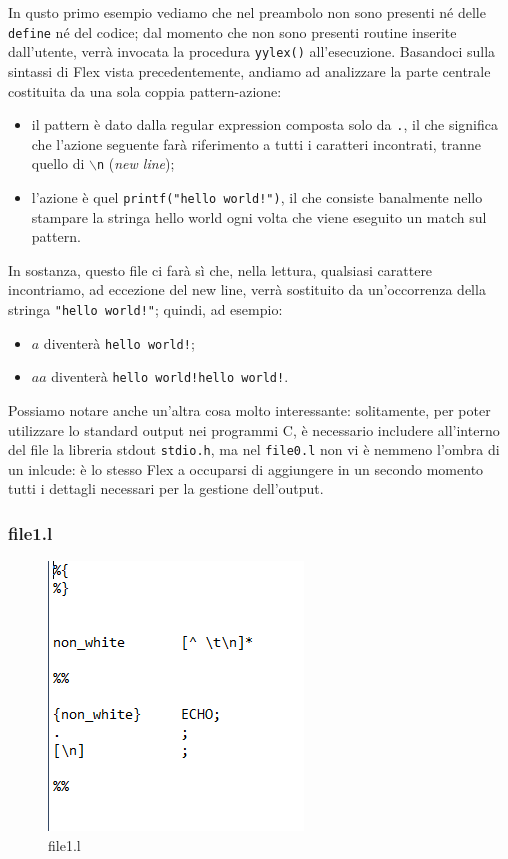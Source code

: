 \documentclass[class=book, crop=false, oneside, 12pt]{standalone}
\begin{document}
In qusto primo esempio vediamo che nel preambolo non sono presenti né delle \texttt{define} né del codice; dal momento che non sono presenti routine inserite dall'utente, verrà invocata la procedura \texttt{yylex()} all'esecuzione. Basandoci sulla sintassi di Flex vista precedentemente, andiamo ad analizzare la parte centrale costituita da una sola coppia pattern-azione:
\begin{itemize}
    \item il pattern è dato dalla regular expression composta solo da \texttt{.}, il che significa che l'azione seguente farà riferimento a tutti i caratteri incontrati, tranne quello di \texttt{\(\backslash\)n} (\emph{new line});
    \item l'azione è quel \texttt{printf("hello world!")}, il che consiste banalmente nello stampare la stringa hello world ogni volta che viene eseguito un match sul pattern.
\end{itemize}
In sostanza, questo file ci farà sì che, nella lettura, qualsiasi carattere incontriamo, ad eccezione del new line, verrà sostituito da un'occorrenza della stringa \texttt{"hello world!"}; quindi, ad esempio:
\begin{itemize}
    \item \(a\) diventerà \texttt{hello world!};
    \item \(aa\) diventerà \texttt{hello world!hello world!}.
\end{itemize}

Possiamo notare anche un'altra cosa molto interessante: solitamente, per poter utilizzare lo standard output nei programmi C, è necessario includere all'interno del file la libreria stdout \texttt{stdio.h}, ma nel \texttt{file0.l} non vi è nemmeno l'ombra di un inlcude: è lo stesso Flex a occuparsi di aggiungere in un secondo momento tutti i dettagli necessari per la gestione dell'output.

\subsubsection{file1.l}
\begin{figure}[h]
    \centering
    \includegraphics[width=.7\textwidth,keepaspectratio]{file1.l.png}
    \caption{file1.l}
    \label{file1.l}
\end{figure}
\end{document}
